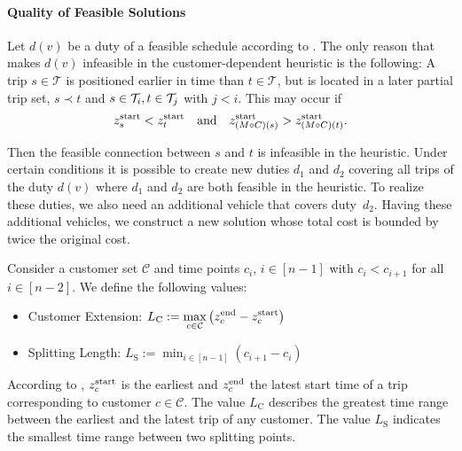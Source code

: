 \paragraph{Quality of Feasible Solutions} \parfill

Let $d(v)$ be a duty of a feasible schedule according to . The only reason that makes $d(v)$ infeasible in the customer-dependent heuristic is the following: A trip ${s\in\mathcal{T}}$ is positioned earlier in time than ${t\in\mathcal{T}}$, but is located in a later partial trip set, \ie ${s\prec t}$ and ${s\in\mathcal{T}_i}, {t\in\mathcal{T}_j}$ with ${j<i}$. This may occur if
\begin{align*}
	z^{\operatorname{start}}_s < z^{\operatorname{start}}_t && \text{and} && z^{\operatorname{start}}_{(M\circ C)(s)} > z^{\operatorname{start}}_{(M\circ C)(t)}.
\end{align*}

Then the feasible connection between $s$ and $t$ is infeasible in the heuristic. Under certain conditions it is possible to create new duties $d_1$ and $d_2$ covering all trips of the duty $d(v)$ where $d_1$ and $d_2$ are both feasible in the heuristic. To realize these duties, we also need an additional vehicle that covers duty~$d_2$. Having these additional vehicles, we construct a new solution whose total cost is bounded by twice the original cost.

\begin{definition}

Consider a customer set $\mathcal{C}$ and time points $c_i$, $i\in[n-1]$ with $c_i<c_{i+1}$ for all $i\in[n-2]$. We define the following values:
\begin{itemize}
	\item{Customer Extension: $\displaystyle{L_{\operatorname{C}} := \max_{c\in\mathcal{C}} \left(z^{\operatorname{end}}_c - z^{\operatorname{start}}_c\right)}$}
	\item{Splitting Length: $\displaystyle{L_{\operatorname{S}} := \min_{i\in[n-1]} \left(c_{i+1}-c_i\right)}$}
\end{itemize}

\end{definition}

According to , $z^{\operatorname{start}}_c$ is the earliest and $z^{\operatorname{end}}_c$ the latest start time of a trip corresponding to customer ${c\in\mathcal{C}}$. The value $L_{\operatorname{C}}$ describes the greatest time range between the earliest and the latest trip of any customer. The value $L_{\operatorname{S}}$ indicates the smallest time range between two splitting points. 

